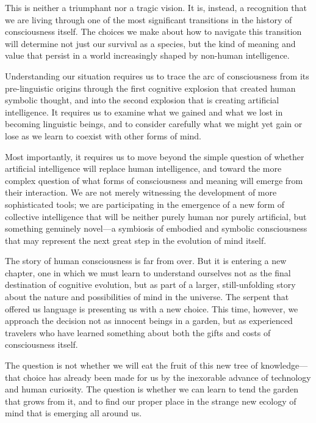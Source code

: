 \documentclass[12pt,letterpaper]{book}
\begin{document}
This is neither a triumphant nor a tragic vision. It is, instead, a recognition that we are living through one of the most significant transitions in the history of consciousness itself. The choices we make about how to navigate this transition will determine not just our survival as a species, but the kind of meaning and value that persist in a world increasingly shaped by non-human intelligence.

Understanding our situation requires us to trace the arc of consciousness from its pre-linguistic origins through the first cognitive explosion that created human symbolic thought, and into the second explosion that is creating artificial intelligence. It requires us to examine what we gained and what we lost in becoming linguistic beings, and to consider carefully what we might yet gain or lose as we learn to coexist with other forms of mind.

Most importantly, it requires us to move beyond the simple question of whether artificial intelligence will replace human intelligence, and toward the more complex question of what forms of consciousness and meaning will emerge from their interaction. We are not merely witnessing the development of more sophisticated tools; we are participating in the emergence of a new form of collective intelligence that will be neither purely human nor purely artificial, but something genuinely novel—a symbiosis of embodied and symbolic consciousness that may represent the next great step in the evolution of mind itself.

The story of human consciousness is far from over. But it is entering a new chapter, one in which we must learn to understand ourselves not as the final destination of cognitive evolution, but as part of a larger, still-unfolding story about the nature and possibilities of mind in the universe. The serpent that offered us language is presenting us with a new choice. This time, however, we approach the decision not as innocent beings in a garden, but as experienced travelers who have learned something about both the gifts and costs of consciousness itself.

The question is not whether we will eat the fruit of this new tree of knowledge—that choice has already been made for us by the inexorable advance of technology and human curiosity. The question is whether we can learn to tend the garden that grows from it, and to find our proper place in the strange new ecology of mind that is emerging all around us.

\end{document}
